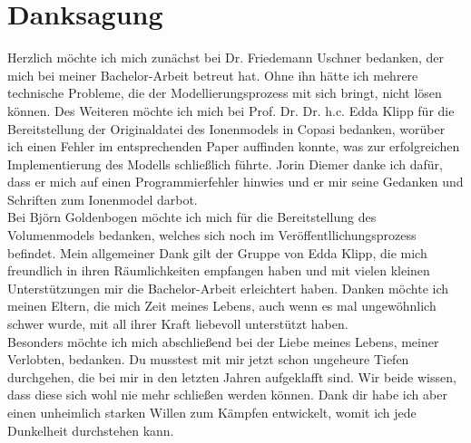 \section{Danksagung}
Herzlich möchte ich mich zunächst bei Dr. Friedemann Uschner bedanken, der mich bei meiner Bachelor-Arbeit betreut hat. Ohne ihn hätte ich mehrere technische Probleme, die der Modellierungsprozess mit sich bringt, nicht lösen können. Des Weiteren möchte ich mich bei Prof. Dr. Dr. h.c. Edda Klipp für die Bereitstellung der Originaldatei des Ionenmodels in Copasi bedanken, worüber ich einen Fehler im entsprechenden Paper auffinden konnte, was zur erfolgreichen Implementierung des Modells schließlich führte. Jorin Diemer danke ich dafür, dass er mich auf einen Programmierfehler hinwies und er mir seine Gedanken und Schriften zum Ionenmodel darbot. \\
Bei Björn Goldenbogen möchte ich mich für die Bereitstellung des Volumenmodels bedanken, welches sich noch im Veröffentllichungsprozess befindet. Mein allgemeiner Dank gilt der Gruppe von Edda Klipp, die mich freundlich in ihren Räumlichkeiten empfangen haben und mit vielen kleinen Unterstützungen mir die Bachelor-Arbeit erleichtert haben.
Danken möchte ich meinen Eltern, die mich Zeit meines Lebens, auch wenn es mal ungewöhnlich schwer wurde, mit all ihrer Kraft liebevoll unterstützt haben. \\
Besonders möchte ich mich abschließend bei der Liebe meines Lebens, meiner Verlobten, bedanken. Du musstest mit mir jetzt schon ungeheure Tiefen durchgehen, die bei mir in den letzten Jahren aufgeklafft sind. Wir beide wissen, dass diese sich wohl nie mehr schließen werden können. Dank dir habe ich aber einen unheimlich starken Willen zum Kämpfen entwickelt, womit ich jede Dunkelheit durchstehen kann.
\newpage